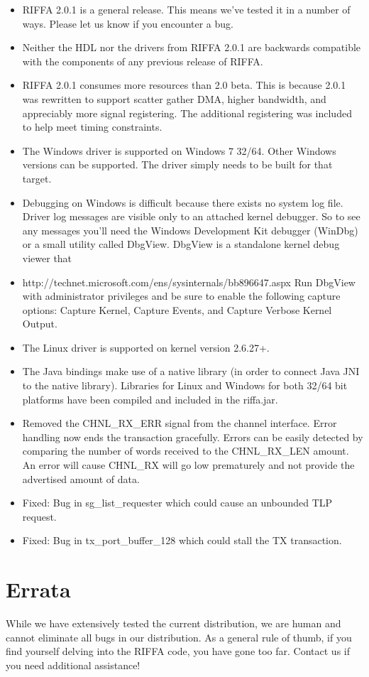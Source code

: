\documentclass{refrep}
\begin{document}
\begin{itemize}
\item RIFFA 2.0.1 is a general release. This means we've tested it in a number of
  ways. Please let us know if you encounter a bug. 
\item Neither the HDL nor the drivers from RIFFA 2.0.1 are backwards compatible with
  the components of any previous release of RIFFA.
\item RIFFA 2.0.1 consumes more resources than 2.0 beta. This is because 2.0.1 was
  rewritten to support scatter gather DMA, higher bandwidth, and appreciably 
  more signal registering. The additional registering was included to help meet 
  timing constraints. 
\item The Windows driver is supported on Windows 7 32/64. Other Windows versions 
  can be supported. The driver simply needs to be built for that target.
\item Debugging on Windows is difficult because there exists no system log file.
  Driver log messages are visible only to an attached kernel debugger. So to see
  any messages you'll need the Windows Development Kit debugger (WinDbg) or a 
  small utility called DbgView. DbgView is a standalone kernel debug viewer that
\item   http://technet.microsoft.com/ens/sysinternals/bb896647.aspx
  Run DbgView with administrator privileges and be sure to enable the following
  capture options: Capture Kernel, Capture Events, and Capture Verbose Kernel 
  Output.
\item The Linux driver is supported on kernel version 2.6.27+. 
\item The Java bindings make use of a native library (in order to connect Java JNI
  to the native library). Libraries for Linux and Windows for both 32/64 bit 
  platforms have been compiled and included in the riffa.jar.
\item Removed the CHNL\_RX\_ERR signal from the channel interface. Error handling now
  ends the transaction gracefully. Errors can be easily detected by comparing
  the number of words received to the CHNL\_RX\_LEN amount. An error will cause
  CHNL\_RX will go low prematurely and not provide the advertised amount of data.
\item Fixed: Bug in sg\_list\_requester which could cause an unbounded TLP request.
\item Fixed: Bug in tx\_port\_buffer\_128 which could stall the TX transaction.
\end{itemize}
\section{Errata}
While we have extensively tested the current distribution, we are human and
cannot eliminate all bugs in our distribution. As a general rule of thumb, if
you find yourself delving into the RIFFA code, you have gone too far. Contact us
if you need additional assistance!
\end{document}
